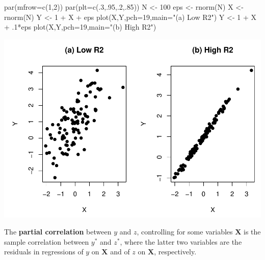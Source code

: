 \documentclass[
]{book}
\newenvironment{Shaded}{\begin{snugshade}}{\end{snugshade}}
\newcommand{\AttributeTok}[1]{\textcolor[rgb]{0.77,0.63,0.00}{#1}}
\newcommand{\DecValTok}[1]{\textcolor[rgb]{0.00,0.00,0.81}{#1}}
\newcommand{\FunctionTok}[1]{\textcolor[rgb]{0.00,0.00,0.00}{#1}}
\newcommand{\NormalTok}[1]{#1}
\newcommand{\OtherTok}[1]{\textcolor[rgb]{0.56,0.35,0.01}{#1}}
\newcommand{\SpecialCharTok}[1]{\textcolor[rgb]{0.00,0.00,0.00}{#1}}
\newcommand{\StringTok}[1]{\textcolor[rgb]{0.31,0.60,0.02}{#1}}
\theoremstyle{definition}
\theoremstyle{definition}
\theoremstyle{definition}
\theoremstyle{definition}
\theoremstyle{remark}
\begin{document}
\begin{Shaded}
\begin{Highlighting}[]
\FunctionTok{par}\NormalTok{(}\AttributeTok{mfrow=}\FunctionTok{c}\NormalTok{(}\DecValTok{1}\NormalTok{,}\DecValTok{2}\NormalTok{))}
\FunctionTok{par}\NormalTok{(}\AttributeTok{plt=}\FunctionTok{c}\NormalTok{(.}\DecValTok{3}\NormalTok{,.}\DecValTok{95}\NormalTok{,.}\DecValTok{2}\NormalTok{,.}\DecValTok{85}\NormalTok{))}
\NormalTok{N }\OtherTok{\textless{}{-}} \DecValTok{100}
\NormalTok{eps }\OtherTok{\textless{}{-}} \FunctionTok{rnorm}\NormalTok{(N)}
\NormalTok{X }\OtherTok{\textless{}{-}} \FunctionTok{rnorm}\NormalTok{(N)}
\NormalTok{Y }\OtherTok{\textless{}{-}} \DecValTok{1} \SpecialCharTok{+}\NormalTok{ X }\SpecialCharTok{+}\NormalTok{ eps}
\FunctionTok{plot}\NormalTok{(X,Y,}\AttributeTok{pch=}\DecValTok{19}\NormalTok{,}\AttributeTok{main=}\StringTok{"(a) Low R2"}\NormalTok{)}
\NormalTok{Y }\OtherTok{\textless{}{-}} \DecValTok{1} \SpecialCharTok{+}\NormalTok{ X }\SpecialCharTok{+}\NormalTok{ .}\DecValTok{1}\SpecialCharTok{*}\NormalTok{eps}
\FunctionTok{plot}\NormalTok{(X,Y,}\AttributeTok{pch=}\DecValTok{19}\NormalTok{,}\AttributeTok{main=}\StringTok{"(b) High R2"}\NormalTok{)}
\end{Highlighting}
\end{Shaded}

\includegraphics{bookdown-demo_files/figure-latex/R2-1.pdf}

The \textbf{partial correlation} between \(y\) and \(z\), controlling for some variables \(\mathbf{X}\) is the sample correlation between \(y^*\) and \(z^*\), where the latter two variables are the residuals in regressions of \(y\) on \(\mathbf{X}\) and of \(z\) on \(\mathbf{X}\), respectively.
\end{document}
